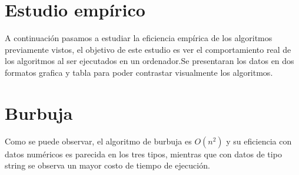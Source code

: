 \documentclass[11pt,openany]{book}
\begin{document}
\section{Estudio empírico}
A continuación pasamos a estudiar la eficiencia empírica de los algoritmos previamente vistos, el objetivo de este estudio es ver el comportamiento real
de los algoritmos al ser ejecutados en un ordenador.Se presentaran los datos en dos formatos grafica y tabla para poder contrastar visualmente los algoritmos.

\section*{Burbuja}
Como se puede observar, el algoritmo de burbuja es \(O(n^2)\) y su eficiencia con datos numéricos es parecida en los tres
tipos, mientras que con datos de tipo string se observa un mayor costo de tiempo de ejecución.
\end{document}
